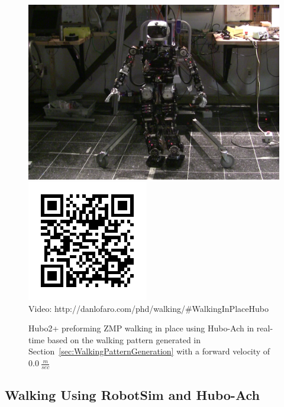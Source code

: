 \begin{figure}[thpb]
  \centering
\includegraphics[width=0.6\columnwidth]{./examples/pix/hubo-walkinginplace.png}
\includegraphics[width=0.3\columnwidth]{./qrcode/qrcode-hubo-walkinginplace.png}\\
      Video: http://danlofaro.com/phd/walking/\#WalkingInPlaceHubo
  \caption{Hubo2+ preforming ZMP walking in place using Hubo-Ach in real-time based on the walking pattern generated in Section~\ref{sec:WalkingPatternGeneration} with a forward velocity of $0.0~\frac{m}{sec}$}
  \label{fig:RealHuboWalkingInPlaceVideo}
\end{figure}






\subsection{Walking Using RobotSim and Hubo-Ach}\label{sec:RobotSimWalking}








